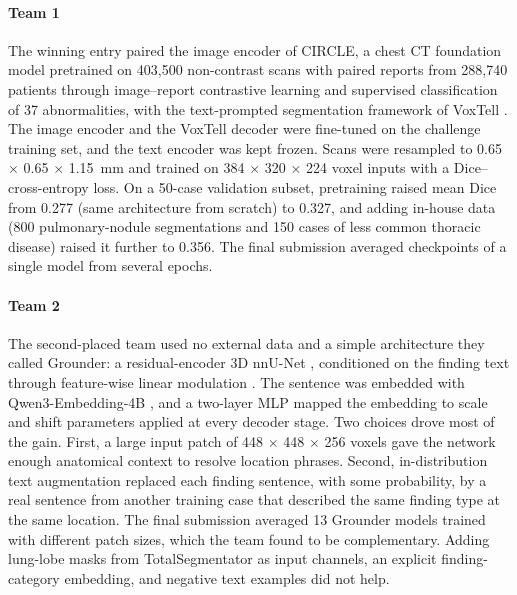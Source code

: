 \documentclass[final,5p,times,twocolumn,authoryear,numafflabel]{elsarticle}
\begin{document}
\paragraph{Team 1} The winning entry paired the image
encoder of CIRCLE, a chest CT foundation model pretrained on 403,500
non-contrast scans with paired reports from 288,740 patients through
image--report contrastive learning and supervised classification of 37
abnormalities, with the text-prompted segmentation framework of VoxTell
\citep{rokuss2026voxtell}. The image encoder and the VoxTell
decoder were fine-tuned on the challenge training set, and the text encoder was
kept frozen. Scans were resampled to 0.65 $\times$ 0.65 $\times$ 1.15~mm
and trained on 384 $\times$ 320 $\times$ 224 voxel inputs with a
Dice--cross-entropy loss. On a 50-case validation subset, pretraining raised
mean Dice from 0.277 (same architecture from scratch) to 0.327, and
adding in-house data (800 pulmonary-nodule segmentations and 150
cases of less common thoracic disease) raised it further to 0.356. The
final submission averaged checkpoints of a single model from several epochs.

\paragraph{Team 2} The second-placed team used no external data
and a simple architecture they called Grounder: a residual-encoder
3D nnU-Net \citep{isensee2021nnu,isensee2024nnu}, conditioned on the finding
text through feature-wise linear modulation \citep{perez2018film}. The sentence was embedded with Qwen3-Embedding-4B
\citep{zhang2025qwen3}, and a two-layer MLP mapped the embedding to
scale and shift parameters applied at every decoder stage. Two choices drove
most of the gain. First, a large input patch of 448 $\times$ 448 $\times$
256 voxels gave the network enough anatomical context to resolve location
phrases. Second, in-distribution text augmentation replaced each finding
sentence, with some probability, by a real sentence from another training case
that described the same finding type at the same location. The final
submission averaged 13 Grounder models trained with different patch
sizes, which the team found to be complementary. Adding lung-lobe masks from
TotalSegmentator as input channels, an explicit finding-category embedding, and
negative text examples did not help.
\end{document}
